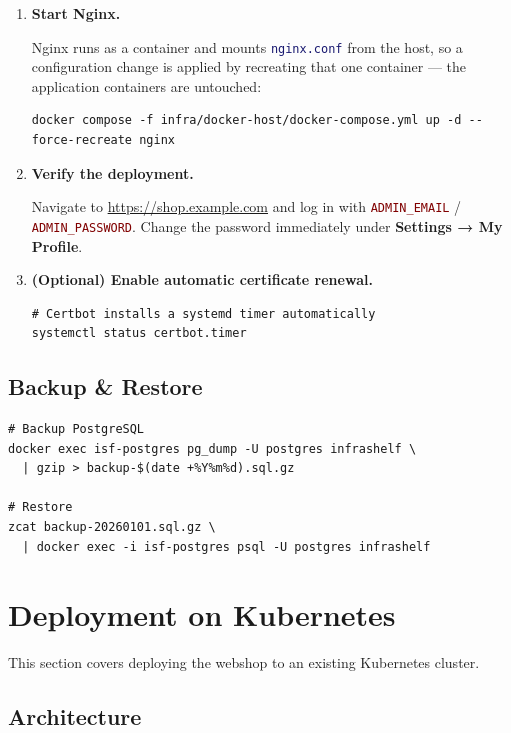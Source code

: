 \documentclass[12pt,a4paper,twoside]{report}
\newcommand{\file}[1]{\texttt{\textcolor{MidnightBlue}{#1}}}
\newcommand{\env}[1]{\texttt{\textcolor{Maroon}{#1}}}
\begin{document}
\begin{enumerate}
\item \textbf{Start Nginx.}

Nginx runs as a container and mounts \file{nginx.conf} from the host, so a
configuration change is applied by recreating that one container --- the
application containers are untouched:

\begin{lstlisting}[style=bash]
docker compose -f infra/docker-host/docker-compose.yml up -d --force-recreate nginx
\end{lstlisting}

\item \textbf{Verify the deployment.}

Navigate to \url{https://shop.example.com} and log in with
\env{ADMIN\_EMAIL} / \env{ADMIN\_PASSWORD}. Change the password
immediately under \textbf{Settings → My Profile}.

\item \textbf{(Optional) Enable automatic certificate renewal.}
\begin{lstlisting}[style=bash]
# Certbot installs a systemd timer automatically
systemctl status certbot.timer
\end{lstlisting}

\end{enumerate}

\subsection*{Backup \& Restore}

\begin{lstlisting}[style=bash]
# Backup PostgreSQL
docker exec isf-postgres pg_dump -U postgres infrashelf \
  | gzip > backup-$(date +%Y%m%d).sql.gz

# Restore
zcat backup-20260101.sql.gz \
  | docker exec -i isf-postgres psql -U postgres infrashelf
\end{lstlisting}

\section{Deployment on Kubernetes}
\label{sec:k8s-deploy}

This section covers deploying the webshop to an existing Kubernetes
cluster.

\subsection*{Architecture}
\end{document}
